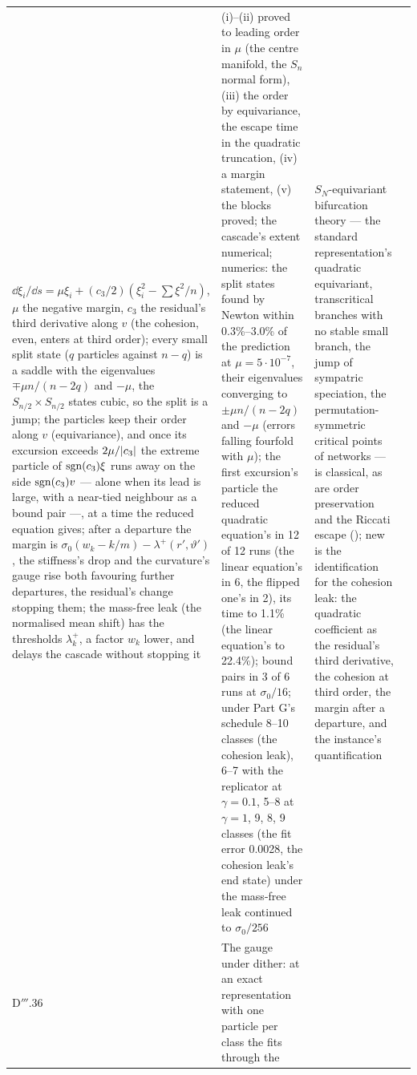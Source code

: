 {\begin{longtable}{@{}>{\raggedright\arraybackslash}p{}>{\raggedright\arraybackslash}p{}%
>{\raggedright\arraybackslash}p{}>{\raggedright\arraybackslash}p{}@{}}
$\dd\xi_i/\dd s = \mu\xi_i + (c_3/2)(\xi_i^2 - \sum\xi^2/n)$, $\mu$ the negative margin, $c_3$ the residual's third
derivative along $v$ (the cohesion, even, enters at third order); every small split state ($q$ particles against
$n - q$) is a saddle with the eigenvalues $\mp\mu n/(n - 2q)$ and $-\mu$, the $S_{n/2}\times S_{n/2}$ states cubic, so
the split is a jump; the particles keep their order along $v$ (equivariance), and once its excursion exceeds
$2\mu/\lvert c_3\rvert$ the extreme particle of $\operatorname{sgn}(c_3)\xi$ runs away on the side $\operatorname{sgn}(c_3)v$ --- alone when its lead is
large, with a near-tied neighbour as a bound pair ---, at a time the reduced equation gives; after a departure the
margin is $\sigma_0(w_k - k/m) - \lambda^+(r',\vartheta')$, the stiffness's drop and the curvature's gauge rise both
favouring further departures, the residual's change stopping them; the mass-free leak (the normalised mean shift) has
the thresholds $\lambda^+_k$, a factor $w_k$ lower, and delays the cascade without stopping it
& (i)--(ii) proved to leading order in $\mu$ (the centre manifold, the $S_n$ normal form), (iii) the order by
equivariance, the escape time in the quadratic truncation, (iv) a margin statement, (v) the blocks proved; the
cascade's extent numerical; numerics: the split states found by Newton within 0.3\%--3.0\% of the prediction at
$\mu = 5\cdot10^{-7}$, their eigenvalues converging to $\pm\mu n/(n - 2q)$ and $-\mu$ (errors falling fourfold with
$\mu$); the first excursion's particle the reduced quadratic equation's in 12 of 12 runs (the linear equation's in 6,
the flipped one's in 2), its time to 1.1\% (the linear equation's to 22.4\%); bound pairs in 3 of 6 runs at
$\sigma_0/16$; under Part G's schedule 8--10 classes (the cohesion leak), 6--7 with the replicator at $\gamma = 0.1$,
5--8 at $\gamma = 1$, 9, 8, 9 classes (the fit error 0.0028, the cohesion leak's end state) under the mass-free leak
continued to $\sigma_0/256$
& $S_N$-equivariant bifurcation theory --- the standard representation's quadratic equivariant, transcritical
branches with no stable small branch, the jump of sympatric speciation, the permutation-symmetric critical points of
networks --- is classical, as are order preservation and the Riccati escape (\cite{S63}); new is the identification
for the cohesion leak: the quadratic coefficient as the residual's third derivative, the cohesion at third order, the
margin after a departure, and the instance's quantification\\
\addlinespace[0.5pt]
D$'''$.36 & The gauge under dither: at an exact representation with one particle per class the fits through the

\end{longtable}}
